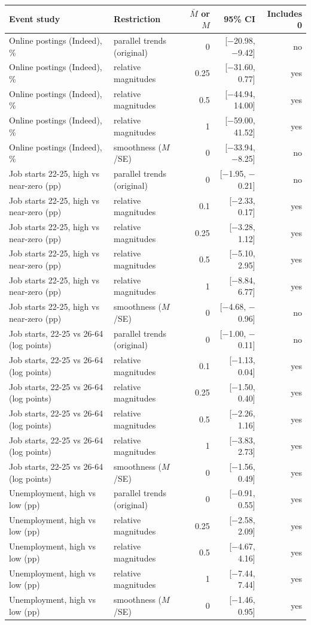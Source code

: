 \begin{tabular}{llrrr}
\toprule
Event study & Restriction & $\bar M$ or $M$ & 95\% CI & Includes 0 \\
\midrule
Online postings (Indeed), \% & parallel trends (original) & 0 & [$-$20.98, $-$9.42] & no \\
Online postings (Indeed), \% & relative magnitudes & 0.25 & [$-$31.60, 0.77] & yes \\
Online postings (Indeed), \% & relative magnitudes & 0.5 & [$-$44.94, 14.00] & yes \\
Online postings (Indeed), \% & relative magnitudes & 1 & [$-$59.00, 41.52] & yes \\
Online postings (Indeed), \% & smoothness ($M$/SE) & 0 & [$-$33.94, $-$8.25] & no \\
Job starts 22-25, high vs near-zero (pp) & parallel trends (original) & 0 & [$-$1.95, $-$0.21] & no \\
Job starts 22-25, high vs near-zero (pp) & relative magnitudes & 0.1 & [$-$2.33, 0.17] & yes \\
Job starts 22-25, high vs near-zero (pp) & relative magnitudes & 0.25 & [$-$3.28, 1.12] & yes \\
Job starts 22-25, high vs near-zero (pp) & relative magnitudes & 0.5 & [$-$5.10, 2.95] & yes \\
Job starts 22-25, high vs near-zero (pp) & relative magnitudes & 1 & [$-$8.84, 6.77] & yes \\
Job starts 22-25, high vs near-zero (pp) & smoothness ($M$/SE) & 0 & [$-$4.68, $-$0.96] & no \\
Job starts, 22-25 vs 26-64 (log points) & parallel trends (original) & 0 & [$-$1.00, $-$0.11] & no \\
Job starts, 22-25 vs 26-64 (log points) & relative magnitudes & 0.1 & [$-$1.13, 0.04] & yes \\
Job starts, 22-25 vs 26-64 (log points) & relative magnitudes & 0.25 & [$-$1.50, 0.40] & yes \\
Job starts, 22-25 vs 26-64 (log points) & relative magnitudes & 0.5 & [$-$2.26, 1.16] & yes \\
Job starts, 22-25 vs 26-64 (log points) & relative magnitudes & 1 & [$-$3.83, 2.73] & yes \\
Job starts, 22-25 vs 26-64 (log points) & smoothness ($M$/SE) & 0 & [$-$1.56, 0.49] & yes \\
Unemployment, high vs low (pp) & parallel trends (original) & 0 & [$-$0.91, 0.55] & yes \\
Unemployment, high vs low (pp) & relative magnitudes & 0.25 & [$-$2.58, 2.09] & yes \\
Unemployment, high vs low (pp) & relative magnitudes & 0.5 & [$-$4.67, 4.16] & yes \\
Unemployment, high vs low (pp) & relative magnitudes & 1 & [$-$7.44, 7.44] & yes \\
Unemployment, high vs low (pp) & smoothness ($M$/SE) & 0 & [$-$1.46, 0.95] & yes \\
\bottomrule
\end{tabular}
